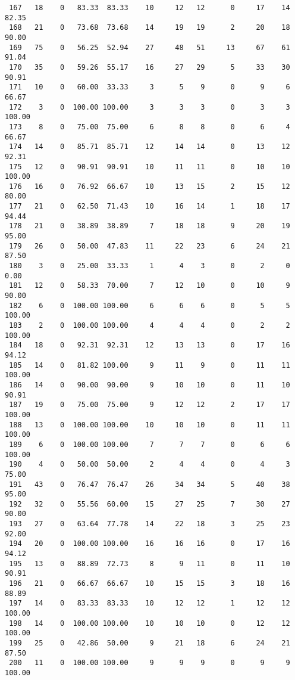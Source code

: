\begin{verbatim}
 167   18    0   83.33  83.33    10     12   12      0     17    14    82.35
 168   21    0   73.68  73.68    14     19   19      2     20    18    90.00
 169   75    0   56.25  52.94    27     48   51     13     67    61    91.04
 170   35    0   59.26  55.17    16     27   29      5     33    30    90.91
 171   10    0   60.00  33.33     3      5    9      0      9     6    66.67
 172    3    0  100.00 100.00     3      3    3      0      3     3   100.00
 173    8    0   75.00  75.00     6      8    8      0      6     4    66.67
 174   14    0   85.71  85.71    12     14   14      0     13    12    92.31
 175   12    0   90.91  90.91    10     11   11      0     10    10   100.00
 176   16    0   76.92  66.67    10     13   15      2     15    12    80.00
 177   21    0   62.50  71.43    10     16   14      1     18    17    94.44
 178   21    0   38.89  38.89     7     18   18      9     20    19    95.00
 179   26    0   50.00  47.83    11     22   23      6     24    21    87.50
 180    3    0   25.00  33.33     1      4    3      0      2     0     0.00
 181   12    0   58.33  70.00     7     12   10      0     10     9    90.00
 182    6    0  100.00 100.00     6      6    6      0      5     5   100.00
 183    2    0  100.00 100.00     4      4    4      0      2     2   100.00
 184   18    0   92.31  92.31    12     13   13      0     17    16    94.12
 185   14    0   81.82 100.00     9     11    9      0     11    11   100.00
 186   14    0   90.00  90.00     9     10   10      0     11    10    90.91
 187   19    0   75.00  75.00     9     12   12      2     17    17   100.00
 188   13    0  100.00 100.00    10     10   10      0     11    11   100.00
 189    6    0  100.00 100.00     7      7    7      0      6     6   100.00
 190    4    0   50.00  50.00     2      4    4      0      4     3    75.00
 191   43    0   76.47  76.47    26     34   34      5     40    38    95.00
 192   32    0   55.56  60.00    15     27   25      7     30    27    90.00
 193   27    0   63.64  77.78    14     22   18      3     25    23    92.00
 194   20    0  100.00 100.00    16     16   16      0     17    16    94.12
 195   13    0   88.89  72.73     8      9   11      0     11    10    90.91
 196   21    0   66.67  66.67    10     15   15      3     18    16    88.89
 197   14    0   83.33  83.33    10     12   12      1     12    12   100.00
 198   14    0  100.00 100.00    10     10   10      0     12    12   100.00
 199   25    0   42.86  50.00     9     21   18      6     24    21    87.50
 200   11    0  100.00 100.00     9      9    9      0      9     9   100.00

\end{verbatim}
